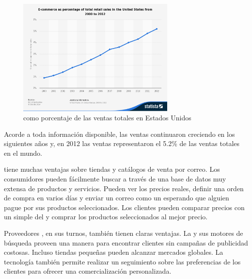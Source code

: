 \begin{figure}[h!]
	\centering
	\includegraphics[width=0.7\textwidth]{figuras/ecommerce_percent.jpg}
	\caption{\ecommerce como porcentaje de las ventas totales en Estados Unidos}
	\label{figure:ecommerce_percent_sales}
\end{figure}

Acorde a toda información disponible, las ventas \ecommerce continuaron creciendo en los siguientes años y, en 2012 las ventas \ecommerce representaron el 5.2\% de las ventas totales en el mundo.

\ecommerce tiene muchas ventajas sobre tiendas \brickandmortar y catálogos de venta por correo. Los consumidores pueden fácilmente buscar a través de una base de datos muy extensa de productos y servicios. Pueden ver los precios reales, definir una orden de compra en varios días y enviar un correo como un \wishlist esperando que alguien pague por sus productos seleccionados. Los clientes pueden comparar precios con un simple \click del \mouse y comprar los productos seleccionados al mejor precio.

Proveedores \online, en sus turnos, también tienen claras ventajas. La \web y sus motores de búsqueda proveen una manera para encontrar clientes sin campañas de publicidad costosas. Incluso tiendas \online pequeñas pueden alcanzar mercados globales. 
La tecnología \web también permite realizar un seguimiento sobre las preferencias de los clientes para ofrecer una comercialización personalizada.

